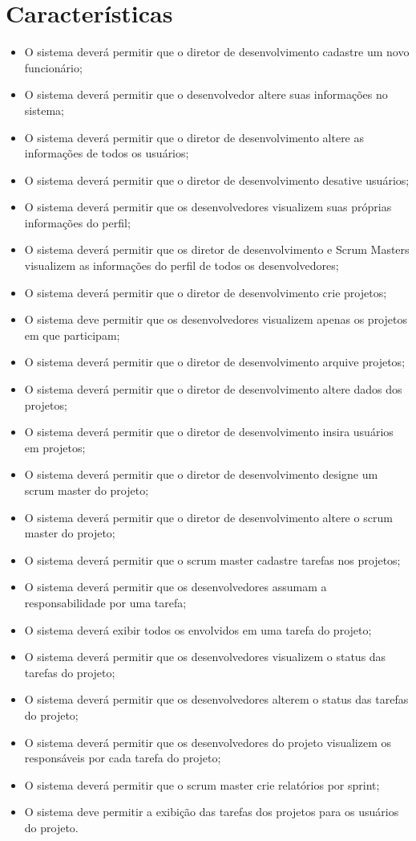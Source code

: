 \section{Características}
    \begin{itemize}
        \item O sistema deverá permitir que o diretor de desenvolvimento cadastre um novo funcionário;
        \item O sistema deverá permitir que o desenvolvedor altere suas informações no sistema;
        \item O sistema deverá permitir que o diretor de desenvolvimento altere as informações de todos os usuários;
        \item O sistema deverá permitir que o diretor de desenvolvimento desative usuários;
        \item O sistema deverá permitir que os desenvolvedores visualizem suas próprias informações do perfil;
        \item O sistema deverá permitir que os diretor de desenvolvimento e Scrum Masters visualizem as informações do perfil de todos os desenvolvedores;
        \item O sistema deverá permitir que o diretor de desenvolvimento crie projetos;
        \item O sistema deve permitir que os desenvolvedores visualizem apenas os projetos em que participam;
        \item O sistema deverá permitir que o  diretor de desenvolvimento  arquive projetos;
        \item O sistema deverá permitir que o diretor de desenvolvimento  altere dados dos projetos;
        \item O sistema deverá permitir que o diretor de desenvolvimento insira usuários em projetos;
        \item O sistema deverá permitir que o diretor de desenvolvimento designe um scrum master do projeto;
        \item O sistema deverá permitir que o  diretor de desenvolvimento altere o scrum master do projeto;
        \item O sistema deverá permitir que o  scrum master cadastre tarefas nos projetos;
        \item O sistema deverá permitir que os desenvolvedores assumam a responsabilidade por uma tarefa;
        \item O sistema deverá exibir todos os envolvidos em uma tarefa do projeto;
        \item O sistema deverá permitir que os desenvolvedores  visualizem o status das tarefas do projeto;
        \item O sistema deverá permitir que os desenvolvedores alterem o status das tarefas do projeto;
        \item O sistema deverá permitir que os desenvolvedores do projeto  visualizem os responsáveis por cada tarefa do projeto;
        \item O sistema deverá permitir que o scrum master crie relatórios por sprint;
        \item O sistema deve permitir a exibição das tarefas dos projetos para os usuários do projeto.
    \end{itemize}
    
